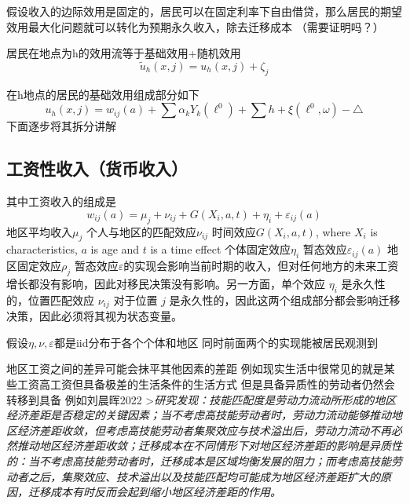 \documentclass[10pt,a4paper]{article}
\begin{document}
假设收入的边际效用是固定的，居民可以在固定利率下自由借贷，那么居民的期望效用最大化问题就可以转化为预期永久收入，除去迁移成本
（需要证明吗？）

居民在地点为h的效用流等于基础效用+随机效用
\begin{equation}
  \tilde u_{h}(x,j)=u_{h}(x,j) +\zeta_j
\end{equation}

在h地点的居民的基础效用组成部分如下
\begin{equation}
  u_h(x,j)=w_{ij}(a)+\sum\limits \alpha_{k}Y_{k}(\ell^{0})+\sum\limits h +\xi(\ell^{0},\omega)-\triangle
\end{equation}
下面逐步将其拆分讲解


\subsection{工资性收入（货币收入）}
其中工资收入的组成是
\begin{equation}
  w_{ij}(a)=\mu_j+\nu_{ij}+G(X_i,a,t)+\eta_i+\varepsilon_{ij}(a)
\end{equation}
地区平均收入$\mu_j$
个人与地区的匹配效应$\nu_{ij}$
时间效应$G(X_{i},a,t)$, where $X_{i}$ is characteristics, $a$ is age and $t$ is a time effect
个体固定效应$\eta_i$
暂态效应$\varepsilon_{ij}(a)$
地区固定效应$\rho_{j}$
暂态效应$\varepsilon$的实现会影响当前时期的收入，但对任何地方的未来工资增长都没有影响，因此对移民决策没有影响。另一方面，单个效应 $\eta_{i}$ 是永久性的，位置匹配效应 $\nu_{ij}$ 对于位置 $j$ 是永久性的，因此这两个组成部分都会影响迁移决策，因此必须将其视为状态变量。

假设$\eta,\nu,\varepsilon$都是iid分布于各个个体和地区
同时前面两个的实现能被居民观测到

地区工资之间的差异可能会抹平其他因素的差距 
例如现实生活中很常见的就是某些工资高工资但具备极差的生活条件的生活方式
但是具备异质性的劳动者仍然会转移到具备
例如刘晨晖2022
>\textit{研究发现：技能匹配度是劳动力流动所形成的地区经济差距是否稳定的关键因素；当不考虑高技能劳动者时，劳动力流动能够推动地区经济差距收敛，但考虑高技能劳动者集聚效应与技术溢出后，劳动力流动不再必然推动地区经济差距收敛；迁移成本在不同情形下对地区经济差距的影响是异质性的：当不考虑高技能劳动者时，迁移成本是区域均衡发展的阻力；而考虑高技能劳动者之后，集聚效应、技术溢出以及技能匹配均可能成为地区经济差距扩大的原因，迁移成本有时反而会起到缩小地区经济差距的作用。}
\end{document}
